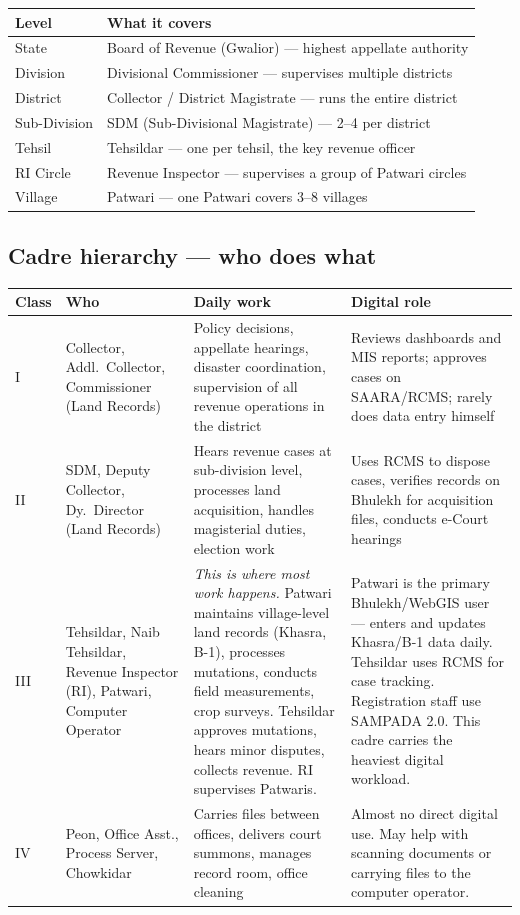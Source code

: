 \documentclass[11pt,a4paper]{article}
\begin{document}
\begin{tabularx}{\textwidth}{@{}L{2.5cm} X@{}}
\toprule
\textbf{Level} & \textbf{What it covers} \\
\midrule
State & Board of Revenue (Gwalior) --- highest appellate authority \\
Division & Divisional Commissioner --- supervises multiple districts \\
District & Collector / District Magistrate --- runs the entire district \\
Sub-Division & SDM (Sub-Divisional Magistrate) --- 2--4 per district \\
Tehsil & Tehsildar --- one per tehsil, the key revenue officer \\
RI Circle & Revenue Inspector --- supervises a group of Patwari circles \\
Village & Patwari --- one Patwari covers 3--8 villages \\
\bottomrule
\end{tabularx}

\subsection{Cadre hierarchy --- who does what}

\begin{tabularx}{\textwidth}{@{}L{1cm} L{3.5cm} L{4.5cm} X@{}}
\toprule
\textbf{Class} & \textbf{Who} & \textbf{Daily work} & \textbf{Digital role} \\
\midrule
I & Collector, Addl.\ Collector, Commissioner (Land Records) & Policy decisions, appellate hearings, disaster coordination, supervision of all revenue operations in the district & Reviews dashboards and MIS reports; approves cases on SAARA/RCMS; rarely does data entry himself \\[6pt]
II & SDM, Deputy Collector, Dy.\ Director (Land Records) & Hears revenue cases at sub-division level, processes land acquisition, handles magisterial duties, election work & Uses RCMS to dispose cases, verifies records on Bhulekh for acquisition files, conducts e-Court hearings \\[6pt]
III & Tehsildar, Naib Tehsildar, Revenue Inspector (RI), Patwari, Computer Operator & \textit{This is where most work happens.} Patwari maintains village-level land records (Khasra, B-1), processes mutations, conducts field measurements, crop surveys. Tehsildar approves mutations, hears minor disputes, collects revenue. RI supervises Patwaris. & Patwari is the primary Bhulekh/WebGIS user --- enters and updates Khasra/B-1 data daily. Tehsildar uses RCMS for case tracking. Registration staff use SAMPADA 2.0. This cadre carries the heaviest digital workload. \\[6pt]
IV & Peon, Office Asst., Process Server, Chowkidar & Carries files between offices, delivers court summons, manages record room, office cleaning & Almost no direct digital use. May help with scanning documents or carrying files to the computer operator. \\
\bottomrule
\end{tabularx}
\end{document}
